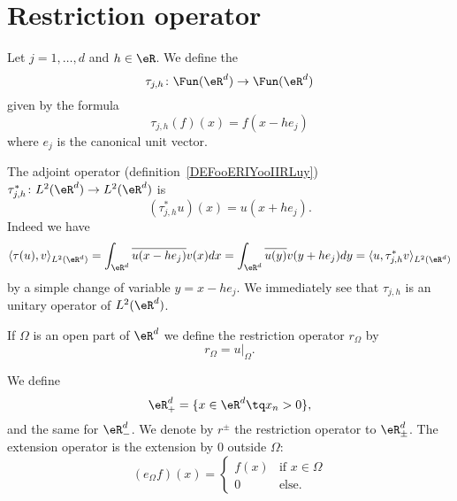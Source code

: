 \section{Restriction operator}

\begin{definition}
	Let \( j=1,\ldots, d\) and \( h\in \eR\). We define the 
	\begin{equation}
		\tau_{j,h}\colon \Fun(\eR^d)\to \Fun(\eR^d)
	\end{equation}
	given by the formula
	\begin{equation}
		\tau_{j,h}(f)(x)=f(x-h e_j)
	\end{equation}
	where \( e_j\) is the canonical unit vector.
\end{definition}

The adjoint operator (definition~\ref{DEFooERIYooIIRLuy}) \( \tau^*_{j,h}\colon L^2(\eR^d)\to L^2(\eR^d)\) is
\begin{equation}
	(\tau^*_{j,h}u)(x)=u(x+he_j).
\end{equation}
Indeed we have
\begin{equation}
	\langle \tau(u), v\rangle_{L^2(\eR^d)}=\int_{\eR^d}\overline{ u(x-he_j) }v(x)dx=\int_{\eR^d}\overline{ u(y) }v(y+he_j)dy=\langle u, \tau^*_{j,h}v\rangle_{L^2(\eR^d)}
\end{equation}
by a simple change of variable \( y=x-he_j\). We immediately see that \( \tau_{j,h}\) is an unitary operator of \( L^2(\eR^d)\).

If \( \Omega\) is an open part of \( \eR^d\) we define the restriction operator \( r_{\Omega}\) by
\begin{equation}
	r_{\Omega}=u|_{\Omega}.
\end{equation}

We define
\begin{equation}
	\eR^d_{+}=\{ x\in \eR^d\tq x_n>0 \},
\end{equation}
and the same for \( \eR^d_-\). We denote by \( r^{\pm}\) the restriction operator to \( \eR^d_{\pm}\). The extension operator is the extension by \( 0\) outside \( \Omega\):
\begin{equation}
	(e_{\Omega}f)(x)=\begin{cases}
		f(x) & \text{if } x\in \Omega \\
		0    & \text{else. }
	\end{cases}
\end{equation}

